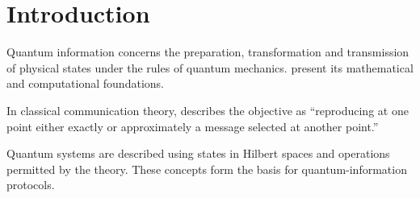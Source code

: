 \chapter{Introduction}
\label{cap:introducao}
Quantum information concerns the preparation, transformation and transmission of physical states under the rules of quantum mechanics. \textcite{nielsen2010} present its mathematical and computational foundations.

In classical communication theory, \textcite[p.~379]{shannon1948} describes the objective as \enquote{reproducing at one point either exactly or approximately a message selected at another point.}

Quantum systems are described using states in Hilbert spaces and operations permitted by the theory. These concepts form the basis for quantum-information protocols.
